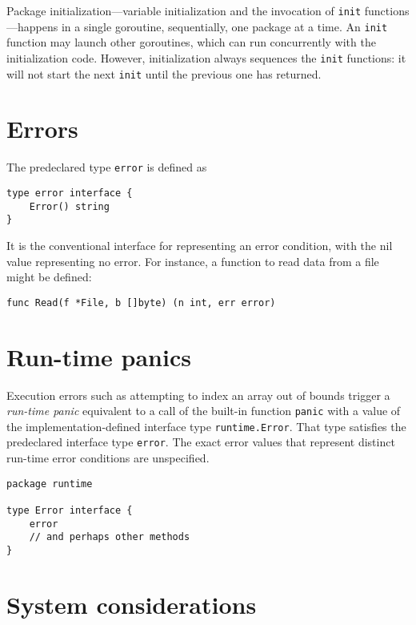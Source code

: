Package initialization---variable initialization and the invocation of
\texttt{init} functions---happens in a single goroutine, sequentially,
one package at a time. An \texttt{init} function may launch other
goroutines, which can run concurrently with the initialization code.
However, initialization always sequences the \texttt{init} functions: it
will not start the next \texttt{init} until the previous one has
returned.

\section*{Errors}

The predeclared type \texttt{error} is defined as

\begin{Verbatim}[frame=single]
type error interface {
    Error() string
}
\end{Verbatim}

It is the conventional interface for representing an error condition,
with the nil value representing no error. For instance, a function to
read data from a file might be defined:

\begin{Verbatim}[frame=single]
func Read(f *File, b []byte) (n int, err error)
\end{Verbatim}

\section*{Run-time panics}

Execution errors such as attempting to index an array out of bounds
trigger a \emph{run-time panic} equivalent to a call of the built-in
function \texttt{panic} with a value of the
implementation-defined interface type \texttt{runtime.Error}. That type
satisfies the predeclared interface type
\texttt{error}. The exact error values that represent
distinct run-time error conditions are unspecified.

\begin{Verbatim}[frame=single]
package runtime

type Error interface {
    error
    // and perhaps other methods
}
\end{Verbatim}

\section*{System considerations}


